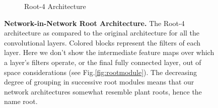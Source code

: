 \documentclass[thesis]{subfiles}
\begin{document}
{\begin{landscape}
\begin{figure}[tb]
\begin{subfigure}[c]{0.9\linewidth}
			\caption{Root-4 Architecture}
			\label{fig:root4topology}
		\end{subfigure}
		\caption{\textbf{Network-in-Network Root Architecture.} The Root-4 architecture as compared to the original architecture for all the convolutional layers. Colored blocks represent the filters of each layer. Here we don't show the intermediate feature maps over which a layer's filters operate, or the final fully connected layer, out of space considerations (see Fig.\ref{fig:rootmodule}). The decreasing degree of grouping in successive root modules means that our network architectures somewhat resemble plant roots, hence the name root.
		}
		\label{fig:networktopology}
	\end{figure}
	\end{landscape}
	}
\end{document}
